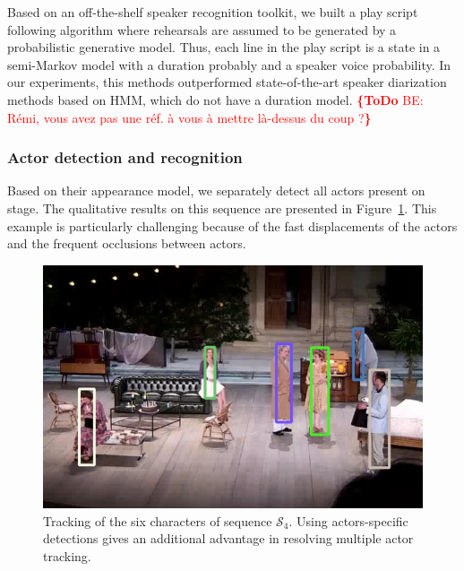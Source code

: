 \documentclass[conference]{IEEEtran}
\newcommand{\todo}[1]{\noindent\textcolor{red}{{\bf \{ToDo} #1{\bf \}}}}
\begin{document}
Based on an off-the-shelf speaker recognition toolkit, we built a play script following algorithm where rehearsals are assumed to be generated by a probabilistic generative model.  Thus, each  line in the play script is a state in a semi-Markov model with a duration probably and a speaker voice probability. In our experiments, this methods outperformed state-of-the-art speaker diarization methods based on HMM, which do not have a duration model.
\todo{BE: Rémi, vous avez pas une réf. à vous à mettre là-dessus du coup ?}



\subsubsection{Actor detection and recognition} 

Based on their appearance model, we separately detect all actors present on stage. The qualitative results on this sequence are presented in Figure~\ref{fig_tracking_coahtr}. This example is particularly challenging  because of the fast displacements of the actors and the frequent occlusions between actors. 

\begin{figure}[tp]
\centering
\includegraphics[width=\columnwidth]{tracking_coahtr}
\caption{Tracking of  the six characters of sequence $\mathcal{S}_4$. Using actors-specific detections gives an additional advantage in resolving multiple actor tracking.}
\label{fig_tracking_coahtr}
\end{figure}
\end{document}
